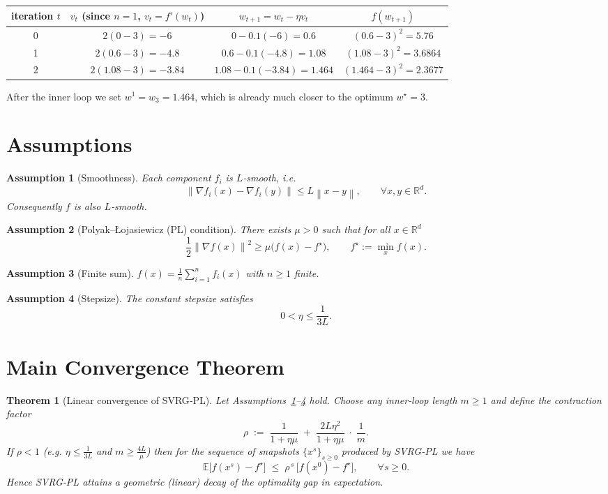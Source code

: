 \documentclass{article}
\newtheorem{theorem}{Theorem}[section]
\newtheorem{assumption}{Assumption}[section]
\newcommand{\EE}{\mathbb{E}}
\newcommand{\RR}{\mathbb{R}}
\newcommand{\grad}{\nabla}
\newcommand{\norm}[1]{\left\|#1\right\|}
\begin{document}
\begin{center}
\begin{tabular}{c|c|c|c}
iteration $t$ & $v_t$ (since $n=1$, $v_t=f'(w_t)$) & $w_{t+1}=w_t-\eta v_t$ & $f(w_{t+1})$\\\hline
0 & $2(0-3)=-6$ & $0-0.1(-6)=0.6$ & $(0.6-3)^2=5.76$\\
1 & $2(0.6-3)=-4.8$ & $0.6-0.1(-4.8)=1.08$ & $(1.08-3)^2=3.6864$\\
2 & $2(1.08-3)=-3.84$ & $1.08-0.1(-3.84)=1.464$ & $(1.464-3)^2=2.3677$\\
\end{tabular}
\end{center}
After the inner loop we set $w^{1}=w_{3}=1.464$, which is already much closer to the optimum $w^{\star}=3$.

\newpage
\section*{Assumptions}
\begin{assumption}[Smoothness]\label{ass:smooth}
Each component $f_i$ is $L$‑smooth, i.e.
\[
\norm{\grad f_i(x)-\grad f_i(y)}\le L\norm{x-y},
\qquad\forall x,y\in\RR^{d}.
\]
Consequently $f$ is also $L$‑smooth.
\end{assumption}

\begin{assumption}[Polyak–\L ojasiewicz (PL) condition]\label{ass:pl}
There exists $\mu>0$ such that for all $x\in\RR^{d}$
\[
\frac12\norm{\grad f(x)}^{2}\ge \mu\bigl(f(x)-f^{\star}\bigr),
\qquad f^{\star}:=\min_{x}f(x).
\]
\end{assumption}

\begin{assumption}[Finite sum]\label{ass:finite}
$f(x)=\frac1n\sum_{i=1}^{n}f_i(x)$ with $n\ge 1$ finite.
\end{assumption}

\begin{assumption}[Stepsize]\label{ass:stepsize}
The constant stepsize satisfies
\[
0<\eta\le \frac{1}{3L}.
\]
\end{assumption}

\section*{Main Convergence Theorem}
\begin{theorem}[Linear convergence of SVRG‑PL]\label{thm:linear}
Let Assumptions~\ref{ass:smooth}--\ref{ass:stepsize} hold.
Choose any inner‑loop length $m\ge 1$ and define the contraction factor
\[
\rho\;:=\; \frac{1}{1+\eta\mu}\;+\;\frac{2L\eta^{2}}{1+\eta\mu}\;\cdot\;\frac{1}{m}.
\]
If $\rho<1$ (e.g. $\eta\le\frac{1}{3L}$ and $m\ge \frac{4L}{\mu}$) then for the sequence of snapshots $\{x^{s}\}_{s\ge0}$
produced by SVRG‑PL we have
\[
\EE\!\bigl[f(x^{s})-f^{\star}\bigr]\;\le\;\rho^{\,s}\,\bigl[f(x^{0})-f^{\star}\bigr],
\qquad\forall s\ge 0.
\tag{2}
\]
Hence SVRG‑PL attains a \emph{geometric} (linear) decay of the optimality gap in expectation.
\end{theorem}
\end{document}
